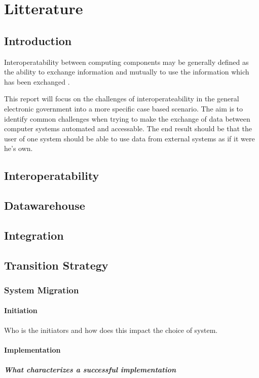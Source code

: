 \part{Litterature}
\chapter{Introduction}
Interoperatability between computing components may be generally defined as the ability to exchange information and mutually to use the information which has been exchanged \cite{6}. 

This report will focus on the challenges of interoperateability in the general electronic government  into a more specific case based scenario. The aim is to identify common challenges when trying to make the exchange of data between computer systems automated and accessable. The end result should be that the user of one system should be able to use data from external systems as if it were he's own.

\chapter{Interoperatability}
\chapter{Datawarehouse}
\chapter{Integration}
\chapter{Transition Strategy}
\section{System Migration \cite{2} \cite{8}}
\subsection{Initiation}
Who is the initiators and how does this impact the choice of system.
\subsection{Implementation}
\subsubsection{What characterizes a successful implementation}
